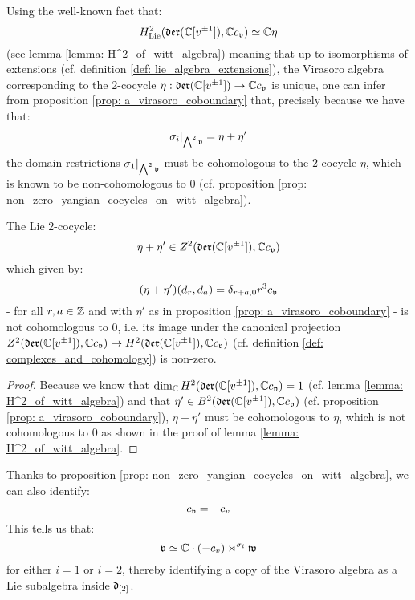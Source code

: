         Using the well-known fact that:
            $$H^2_{\mathrm{Lie}}(\mathfrak{der}(\mathbb{C}[v^{\pm 1}]), \mathbb{C} c_{\mathfrak{v}}) \simeq \mathbb{C} \eta$$
        (see lemma \ref{lemma: H^2_of_witt_algebra}) meaning that up to isomorphisms of extensions (cf. definition \ref{def: lie_algebra_extensions}), the Virasoro algebra corresponding to the $2$-cocycle $\eta: \mathfrak{der}(\mathbb{C}[v^{\pm 1}]) \to \mathbb{C} c_{\mathfrak{v}}$ is unique, one can infer from proposition \ref{prop: a_virasoro_coboundary} that, precisely because we have that:
            $$\sigma_i|_{ \bigwedge^2 \mathfrak{v} } = \eta + \eta'$$
        the domain restrictions $\sigma_1|_{ \bigwedge^2 \mathfrak{v} }$ must be cohomologous to the $2$-cocycle $\eta$, which is known to be non-cohomologous to $0$ (cf. proposition \ref{prop: non_zero_yangian_cocycles_on_witt_algebra}). 
        \begin{proposition} \label{prop: non_zero_yangian_cocycles_on_witt_algebra}
            The Lie $2$-cocycle:
                $$\eta + \eta' \in Z^2(\mathfrak{der}(\mathbb{C}[v^{\pm 1}]), \mathbb{C} c_{\mathfrak{v}})$$
            which given by:
                $$(\eta + \eta')(d_r, d_a) = \delta_{r + a, 0} r^3 c_{\mathfrak{v}}$$
            - for all $r, a \in \mathbb{Z}$ and with $\eta'$ as in proposition \ref{prop: a_virasoro_coboundary} - is not cohomologous to $0$, i.e. its image under the canonical projection $Z^2(\mathfrak{der}(\mathbb{C}[v^{\pm 1}]), \mathbb{C} c_{\mathfrak{v}}) \to H^2(\mathfrak{der}(\mathbb{C}[v^{\pm 1}]), \mathbb{C} c_{\mathfrak{v}})$ (cf. definition \ref{def: complexes_and_cohomology}) is non-zero.
        \end{proposition}
            \begin{proof}
                Because we know that $\dim_{\mathbb{C}} H^2(\mathfrak{der}(\mathbb{C}[v^{\pm 1}]), \mathbb{C} c_{\mathfrak{v}}) = 1$ (cf. lemma \ref{lemma: H^2_of_witt_algebra}) and that $\eta' \in B^2(\mathfrak{der}(\mathbb{C}[v^{\pm 1}]), \mathbb{C} c_{\mathfrak{v}})$ (cf. proposition \ref{prop: a_virasoro_coboundary}), $\eta + \eta'$ must be cohomologous to $\eta$, which is not cohomologous to $0$ as shown in the proof of lemma \ref{lemma: H^2_of_witt_algebra}.
            \end{proof}
        \begin{remark}
            Thanks to proposition \ref{prop: non_zero_yangian_cocycles_on_witt_algebra}, we can also identify:
                $$c_{\mathfrak{v}} = -c_v$$
            This tells us that:
                $$\mathfrak{v} \simeq \mathbb{C} \cdot (-c_v) \rtimes^{\sigma_i} \mathfrak{w}$$
            for either $i = 1$ or $i = 2$, thereby identifying a copy of the Virasoro algebra as a Lie subalgebra inside $\mathfrak{d}_{[2]}$.
        \end{remark}

